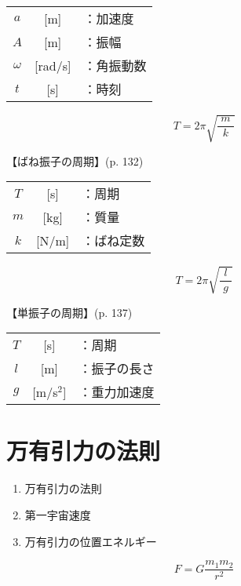 \documentclass[10pt]{jarticle}
\begin{document}
\begin{tabular}{ccl}
$a$	&[m]&	：加速度\\
$A$	&[m]	&：振幅\\
$\omega $	&[rad/s]	&：角振動数 \\
$t$	&[s]	&：時刻 \\
\end{tabular}



\newpage
\[
	T = 2\pi \sqrt{\frac{\; m \;}{k}}
\]


\vskip3mm
【ばね振子の周期】{\footnotesize (p. 132)}

\begin{tabular}{ccl}
$T$	&[s]&	：周期\\
$m$	&[kg]	&：質量\\
$k$	&[N/m]	&：ばね定数
\end{tabular}






\newpage
\[
	T = 2\pi \sqrt{\frac{l}{\; g \;}}
\]


\vskip3mm
【単振子の周期】{\footnotesize (p. 137)}

\begin{tabular}{ccl}
$T$	&[s]&	：周期\\
$l$	&[m]	&：振子の長さ\\
$g$	&[m/s$^2$]	&：重力加速度
\end{tabular}







\newpage
\addtocounter{page}{-1}
\thispagestyle{empty}
\section{万有引力の法則}

\begin{enumerate}
\setcounter{enumi}{\thepage}
\small
\itemsep-4mm
\item 万有引力の法則\\
\item 第一宇宙速度\\
\item 万有引力の位置エネルギー
\end{enumerate}




\newpage
\[
F = G \frac{m_1 m_2}{r^2}
\]
\end{document}
